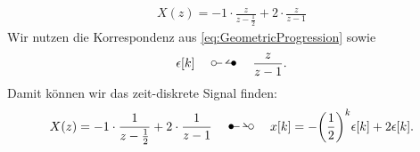 \begin{align}
	X(z)=-1\cdot\frac{z}{z-\frac{1}{2}}+2\cdot\frac{z}{z-1}
\end{align}
Wir nutzen die Korrespondenz aus \ref{eq:GeometricProgression} sowie 
\begin{align}
	\epsilon[k]\quad\ztransf\quad\frac{z}{z-1}.
\end{align}
Damit können wir das zeit-diskrete Signal finden:
\begin{align}
	X(z)=-1\cdot\frac{1}{z-\frac{1}{2}}+2\cdot\frac{1}{z-1}\quad\Ztransf\quad x[k]=-\bigg(\frac{1}{2}\bigg)^k\epsilon[k]+2\epsilon[k].
\end{align}
